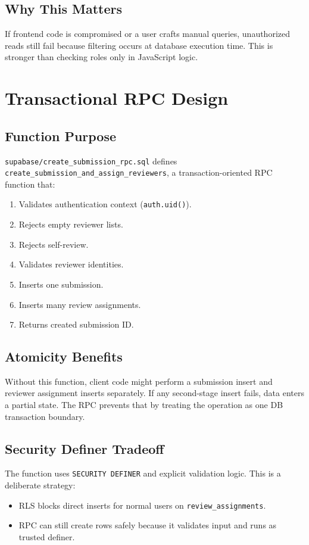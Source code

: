\documentclass[11pt]{article}
\begin{document}
\subsection{Why This Matters}
If frontend code is compromised or a user crafts manual queries, unauthorized reads still fail because filtering occurs at database execution time. This is stronger than checking roles only in JavaScript logic.

\section{Transactional RPC Design}
\subsection{Function Purpose}
\texttt{supabase/create\_submission\_rpc.sql} defines \texttt{create\_submission\_and\_assign\_reviewers}, a transaction-oriented RPC function that:
\begin{enumerate}[leftmargin=*]
  \item Validates authentication context (\texttt{auth.uid()}).
  \item Rejects empty reviewer lists.
  \item Rejects self-review.
  \item Validates reviewer identities.
  \item Inserts one submission.
  \item Inserts many review assignments.
  \item Returns created submission ID.
\end{enumerate}

\subsection{Atomicity Benefits}
Without this function, client code might perform a submission insert and reviewer assignment inserts separately. If any second-stage insert fails, data enters a partial state. The RPC prevents that by treating the operation as one DB transaction boundary.

\subsection{Security Definer Tradeoff}
The function uses \texttt{SECURITY DEFINER} and explicit validation logic. This is a deliberate strategy:
\begin{itemize}[leftmargin=*]
  \item RLS blocks direct inserts for normal users on \texttt{review\_assignments}.
  \item RPC can still create rows safely because it validates input and runs as trusted definer.
\end{itemize}
\end{document}
